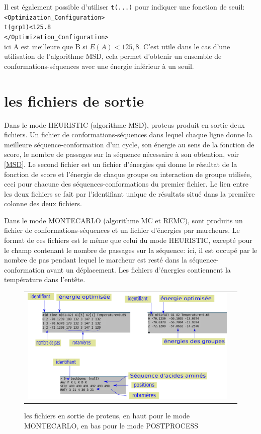 Il est également possible d'utiliser \verb!t(...)! pour indiquer une fonction de seuil:\\
\verb!<Optimization_Configuration>! \\
\verb!t(grp1)<125.8! \\
\verb!</Optimization_Configuration>! \\
ici A est meilleure que B si $E(A)<125,8$. C'est utile dans le cas d'une utilisation de l'algorithme MSD, cela permet d'obtenir un ensemble de conformations-séquences avec une énergie inférieur à un seuil.


\section{les fichiers de sortie}
\label{proteusIO}
Dans le mode HEURISTIC (algorithme MSD), proteus produit en sortie deux fichiers. Un fichier de conformations-séquences dans lequel chaque ligne donne la meilleure séquence-conformation d'un cycle, son énergie au sens de la fonction de score, le nombre de passages sur la séquence nécessaire à son obtention, voir \ref{MSD}. Le second fichier est un fichier d'énergies qui donne le résultat de la fonction de score et l'énergie de chaque groupe ou interaction de groupe utilisée, ceci pour chacune des séquences-conformations du premier fichier. Le lien entre les deux fichiers se fait par l'identifiant unique de résultats situé dans la première colonne des deux fichiers.

Dans le mode MONTECARLO (algorithme MC et REMC), sont produits un fichier de conformations-séquences et un fichier d'énergies par marcheurs. Le format de ces fichiers est le même que celui du mode HEURISTIC, excepté pour le champ contenant le nombre de passages sur la séquence: ici, il est occupé par le nombre de pas pendant lequel le marcheur est resté dans la séquence-conformation avant un déplacement. Les fichiers d'énergies contiennent la température dans l'entête.

   \begin{figure}[!htbp]
     \centering
     \begin{tabular}{cc}
       \includegraphics[width=12cm]{figure/output.png} &
     \end{tabular}
     
     \caption{les fichiers en sortie de proteus, en haut pour le mode MONTECARLO, en bas pour le mode POSTPROCESS}
\label{proteusoutput}
   \end{figure}




